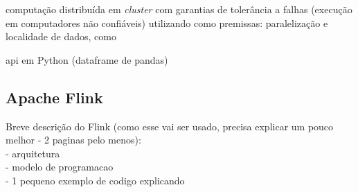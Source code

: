 computação distribuída em \emph{cluster} com garantias de tolerância a falhas
(execução em computadores não confiáveis) utilizando como premissas: paralelização
e localidade de dados, como 

api em Python (dataframe de pandas)

\subsection{Apache Flink}
Breve descrição do Flink (como esse vai ser usado, precisa explicar um pouco melhor - 2 paginas pelo menos):\\
- arquitetura\\
- modelo de programacao\\
- 1 pequeno exemplo de codigo explicando


